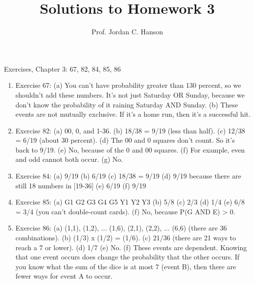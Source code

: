 \documentclass{article}
\begin{document}
\title{Solutions to Homework 3}
\author{Prof. Jordan C. Hanson}

\maketitle

Exercises, Chapter 3: 67, 82, 84, 85, 86

\begin{enumerate}
\item Exercise 67: (a) You can't have probability greater than 130 percent, so we shouldn't add these numbers.  It's not just Saturday OR Sunday, because we don't know the probability of it raining Saturday AND Sunday. (b) These events are not mutually exclusive.  If it's a home run, then it's a successful hit.
\item Exercise 82: (a) 00, 0, and 1-36. (b) 18/38 = 9/19 (less than half). (c) 12/38 = 6/19 (about 30 percent). (d) The 00 and 0 squares don't count.  So it's back to 9/19. (e) No, because of the 0 and 00 squares. (f) For example, even and odd cannot both occur. (g) No.
\item Exercise 84: (a) 9/19 (b) 6/19 (c) 18/38 = 9/19 (d) 9/19 because there are still 18 numbers in [19-36] (e) 6/19 (f) 9/19
\item Exercise 85: (a) G1 G2 G3 G4 G5 Y1 Y2 Y3 (b) 5/8 (c) 2/3 (d) 1/4 (e) 6/8 = 3/4 (you can't double-count cards). (f) No, because P(G AND E) > 0.
\item Exercise 86: (a) (1,1), (1,2), ... (1,6), (2,1), (2,2), ... (6,6) (there are 36 combinations). (b) (1/3) x (1/2) = (1/6). (c) 21/36 (there are 21 ways to reach a 7 or lower). (d) 1/7 (e) No. (f) These events are dependent. Knowing that one event occurs does change the probability that the other occurs. If you know what the sum of the dice is at most 7 (event B), then there are fewer ways for event A to occur.
\end{enumerate}
\end{document}
